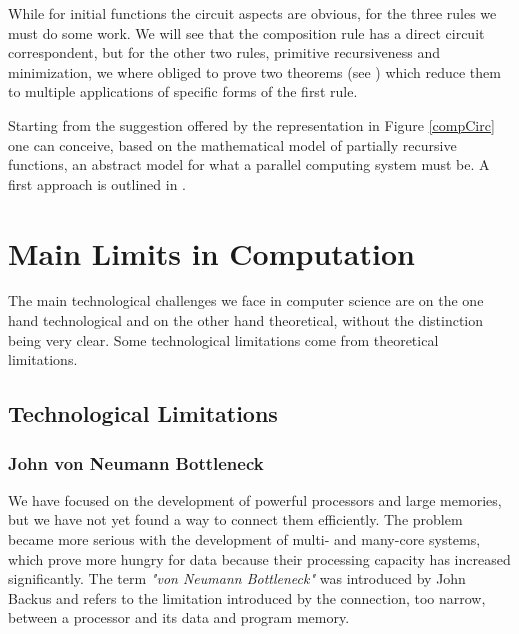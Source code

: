 While for  initial functions the circuit aspects are obvious, for the three rules we must do some work. We will see that the composition rule has a direct circuit correspondent, but for the other two rules, primitive recursiveness and minimization, we where obliged to prove two theorems (see \citep{Stefan20}) which reduce them to multiple applications of specific forms of the first rule.



Starting from the suggestion offered by the representation in Figure \ref{compCirc} one can conceive, based on the mathematical model of partially recursive functions, an abstract model for what a parallel computing system must be. A first approach is outlined in \citep{Stefan14}.

\section{Main Limits in Computation}

The main technological challenges we face in computer science are on the one hand technological and on the other hand theoretical, without the distinction being very clear. Some technological limitations come from theoretical limitations.

\subsection{Technological Limitations}

\subsubsection{John von Neumann Bottleneck}

We have focused on the development of powerful processors and large memories, but we have not yet found a way to connect them efficiently. The problem became more serious with the development of multi- and many-core systems, which prove more hungry for data because their processing capacity has increased significantly. The term {\em "von Neumann Bottleneck"} was introduced by John Backus \citep{Backus78} and refers to the limitation introduced by the connection, too narrow, between a processor and its data and program memory.


